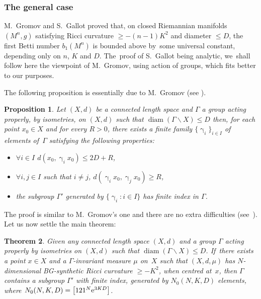 \documentclass[pdftex]{sigma}
\numberwithin{equation}{section}
\newtheorem{theor}{Theorem}[section]
\newtheorem{prop}[theor]{Proposition}
\newcommand{\diam}{\operatorname{diam}}
\newcommand{\g}{\operatorname{\gamma}}
\begin{document}
\subsubsection{The general case}
M.~Gromov and S.~Gallot proved that, on closed Riemannian manifolds $(M^n, g)$ satisfying Ricci curvature $\ge - (n-1) K^2$ and diameter $\le D$,
the first Betti number $b_1 (M^n)$ is bounded above by~some universal constant, depending only on $n$, $K$ and $D$. The~proof of S.~Gallot being analytic, we~shall follow here the viewpoint
of M.~Gromov, using action of groups, which fits better to our purposes.

The following proposition is essentially due to M.~Gromov (see \cite[Lemma~5.19]{Gr1}).

\begin{prop}\label{gromovarg}
Let $(X,d)$ be a connected length space and $\Gamma$ a group acting properly, by isometries, on $(X,d)$ such that $\diam (\Gamma \backslash X) \le
D$ then, for
each point $x_0 \in X$ and for every $R> 0$, there exists a finite family
$\{\g_i\}_{i \in I}$ of elements of~$\Gamma$ satisfying the following properties:
\begin{itemize}\itemsep=0pt

\item[$(i)$] $ \forall i \in I$ $d(x_0, \g_i x_0) \le 2 D + R$,

\item[$(ii)$] $ \forall i, j \in I$ such that $i\ne j$, $d(\g_i x_0, \g_j x_0) \ge R$,

\item[$(iii)$] the subgroup $\Gamma'$ generated by $\{\g_i\colon i \in I\}$ has
finite index in $\Gamma$.

\end{itemize}
\end {prop}

The proof is similar to M.~Gromov's one and there are no extra difficulties (see~\cite[proof of~Lemma~5.19]{Gr1}).
Let us now settle the main theorem:

\begin{theor}\label{finitelygenerated}
Given any connected length space $(X, d)$ and a group $\Gamma$ acting properly by isometries on $(X, d)$ such that $\diam ( \Gamma \backslash X)\le D$. If~there exists a point $x \in X$ and a $\Gamma$-invariant measure $\mu$ on~$X$ such that $(X,d,\mu)$ has $N$-dimensional BG-synthetic Ricci curvature
$\ge -K^2$, when centred at~$x$, then $\Gamma$ contains a subgroup $\Gamma'$ with finite index, generated by $ N_0 (N, K, D)$ elements, where
$N_0 (N, K, D) = \big[121^N {\rm e}^{3 K D}\big]$.
\end{theor}
\end{document}
